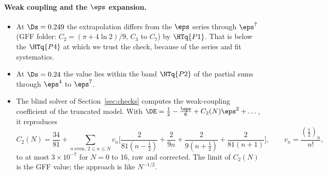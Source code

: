 \paragraph{Weak coupling and the $\eps$ expansion.}\label{sec:d1-pert}
\begin{itemize}
\item At $\Ds=0.249$ the extrapolation differs from the $\eps$ series through $\eps^7$ (GFF folder:
 $C_2=(\pi+4\ln2)/9$, $C_3$ to $C_7$) by $\HTq{P1}$. That is below the $\HTq{P4}$ at which we trust the check,
 because of the series and fit systematics.
\item At $\Ds=0.24$ the value lies within the band $\HTq{P2}$ of the partial sums through $\eps^4$ to $\eps^7$.
\item The blind solver of Section~\ref{sec:checks} computes the weak-coupling coefficient of the truncated model.
 With $\DE=\frac12-\frac\eps6+C_2(N)\eps^2+\dots$, it reproduces
 \begin{equation}
 C_2(N)=\frac{34}{81}+\sum_{n\ \text{even},\,2\le n\le N}v_n\Big[\frac{2}{81(n-\frac12)}+\frac{2}{9n}+\frac{2}{9(n+\frac12)}+\frac{2}{81(n+1)}\Big],\qquad v_n=\frac{(\frac12)_n}{n!},
 \label{eq:C2N}
 \end{equation}
 to at most $3\times10^{-7}$ for $N=0$ to 16, raw and corrected. The limit of $C_2(N)$ is the GFF value; the
 approach is like $N^{-1/2}$.
\end{itemize}


